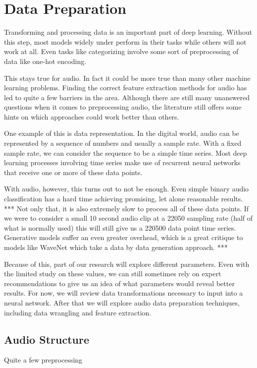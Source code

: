 \documentclass{book}
\begin{document}
\chapter{Data Preparation}
Transforming and processing data is an important part of deep learning.
Without this step, most models widely under perform in their tasks while others will not work at all.
Even tasks like categorizing involve some sort of preprocessing of data like one-hot encoding.
\par
This stays true for audio.
In fact it could be more true than many other machine learning problems.
Finding the correct feature extraction methods for audio has led to quite a few barriers in the area.
Although there are still many unanswered questions when it comes to preprocessing audio, the literature still offers some hints on which approaches could work better than others.
\par
One example of this is data representation.
In the digital world, audio can be represented by a sequence of numbers and usually a sample rate.
With a fixed sample rate, we can consider the sequence to be a simple time series.
Most deep learning processes involving time series make use of recurrent neural networks that receive one or more of these data points.
\par
With audio, however, this turns out to not be enough.
Even simple binary audio classification has a hard time achieving promising, let alone reasonable results. *** %
Not only that, it is also extremely slow to process all of these data points.
If we were to consider a small 10 second audio clip at a 22050 sampling rate (half of what is normally used) this will still give us a 220500 data point time series.
Generative models suffer an even greater overhead, which is a great critique to models like WaveNet which take a data by data generation approach. *** %
\par
Because of this, part of our research will explore different parameters.
Even with the limited study on these values, we can still sometimes rely on expert recommendations to give us an idea of what parameters would reveal better results.
For now, we will review data transformations necessary to input into a neural network.
After that we will explore audio data preparation techniques, including data wrangling and feature extraction.
\section{Audio Structure}
Quite a few preprocessing 
\end{document}
